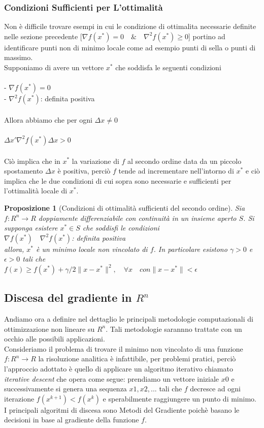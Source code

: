 \documentclass[a4paper, 12pt]{article}
\newtheorem{prop}{Proposizione}
\begin{document}
\subsubsection{Condizioni Sufficienti per L'ottimalità}
Non è difficile trovare esempi in cui le condizione di ottimalita necessarie definite nelle sezione precedente
[$\nabla f(x^\ast) = 0 \quad \& \quad \nabla^2 f(x^\ast) \geq 0$]
portino ad identificare punti non di minimo locale come ad esempio punti di sella o punti di massimo.\\
Supponiamo di avere un vettore $x^\ast$ che soddisfa le seguenti condizioni\\\\
- $\nabla f(x^\ast) = 0$\\
- $\nabla^2 f(x^\ast)$: definita positiva\\\\
Allora abbiamo che per ogni $\Delta x \neq 0$\\\\
$\Delta x' \nabla^2f(x^\ast) \Delta x > 0$\\\\
Ciò implica che in $x^\ast$ la variazione di $f$ al secondo ordine data da un piccolo spostamento $\Delta x$ è positiva, perciò $f$ tende ad incrementare nell'intorno di $x^\ast$ e ciò implica che le due condizioni di cui sopra sono necessarie e sufficienti per l'ottimalità locale di $x^\ast$.
\begin{prop}[Condizioni di ottimalità sufficienti del secondo ordine] Sia $f:R^n \to R$ doppiamente differenziabile con continuità in un insieme aperto $S$. Si supponga esistere $x^\ast \in S$ che soddisfi le condizioni\\
$\nabla f(x^\ast) \quad \nabla^2 f(x^\ast)$: definita positiva\\
allora, $x^\ast$ è un minimo locale non vincolato di $f$. In particolare esistono $\gamma > 0$ e $\epsilon > 0$ tali che\\
$f(x) \geq f(x^\ast) + \gamma/2\parallel x - x^\ast \parallel^2, \quad \forall x \quad con \parallel x - x^\ast \parallel < \epsilon$
\end{prop}
\subsection{Discesa del gradiente in $R^n$}
Andiamo ora a definire nel dettaglio le principali metodologie computazionali di ottimizzazione non lineare su $R^n$. Tali metodologie sarannno trattate con un occhio alle possibili applicazioni.\\
Consideriamo il problema di trovare il minimo non vincolato di una funzione $f:R^n \to R$ la risoluzione analitica è infattibile, per problemi pratici, perciò l'approccio adottato è quello di applicare un algoritmo iterativo chiamato \textit{iterative descent} che opera come segue: prendiamo un vettore iniziale $x0$ e successivamente si genera una sequenza $x1, x2, ...$ tali che $f$ decresce ad ogni iterazione $f(x^{k+1}) < f(x^k)$ e sperabilmente raggiungere un punto di minimo.\\
I principali algoritmi di discesa sono Metodi del Gradiente poichè basano le decisioni in base al gradiente della funzione $f$.
\end{document}

